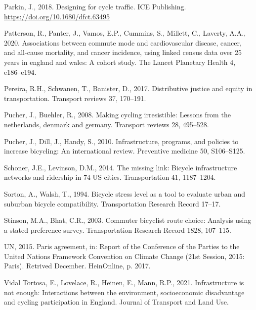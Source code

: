 \documentclass[
]{article}
\newlength{\cslhangindent}
\newlength{\cslentryspacingunit} %
\newenvironment{CSLReferences}[2] %
 {%
  \setlength{\parindent}{0pt}
  \ifodd #1
  \let\oldpar\par
  \def\par{\hangindent=\cslhangindent\oldpar}
  \fi
  \setlength{\parskip}{#2\cslentryspacingunit}
 }%
 {}
\begin{document}
\begin{CSLReferences}{1}{0}
\leavevmode{}%
Parkin, J., 2018. Designing for cycle traffic. ICE Publishing. \url{https://doi.org/10.1680/dfct.63495}

\leavevmode{}%
Patterson, R., Panter, J., Vamos, E.P., Cummins, S., Millett, C., Laverty, A.A., 2020. Associations between commute mode and cardiovascular disease, cancer, and all-cause mortality, and cancer incidence, using linked census data over 25 years in england and wales: A cohort study. The Lancet Planetary Health 4, e186--e194.

\leavevmode{}%
Pereira, R.H., Schwanen, T., Banister, D., 2017. Distributive justice and equity in transportation. Transport reviews 37, 170--191.

\leavevmode{}%
Pucher, J., Buehler, R., 2008. Making cycling irresistible: Lessons from the netherlands, denmark and germany. Transport reviews 28, 495--528.

\leavevmode{}%
Pucher, J., Dill, J., Handy, S., 2010. Infrastructure, programs, and policies to increase bicycling: An international review. Preventive medicine 50, S106--S125.

\leavevmode{}%
Schoner, J.E., Levinson, D.M., 2014. The missing link: Bicycle infrastructure networks and ridership in 74 US cities. Transportation 41, 1187--1204.

\leavevmode{}%
Sorton, A., Walsh, T., 1994. Bicycle stress level as a tool to evaluate urban and suburban bicycle compatibility. Transportation Research Record 17--17.

\leavevmode{}%
Stinson, M.A., Bhat, C.R., 2003. Commuter bicyclist route choice: Analysis using a stated preference survey. Transportation Research Record 1828, 107--115.

\leavevmode{}%
UN, 2015. Paris agreement, in: Report of the Conference of the Parties to the United Nations Framework Convention on Climate Change (21st Session, 2015: Paris). Retrived December. HeinOnline, p. 2017.

\leavevmode{}%
Vidal Tortosa, E., Lovelace, R., Heinen, E., Mann, R.P., 2021. Infrastructure is not enough: Interactions between the environment, socioeconomic disadvantage and cycling participation in {England}. Journal of Transport and Land Use.


\end{CSLReferences}
\end{document}
